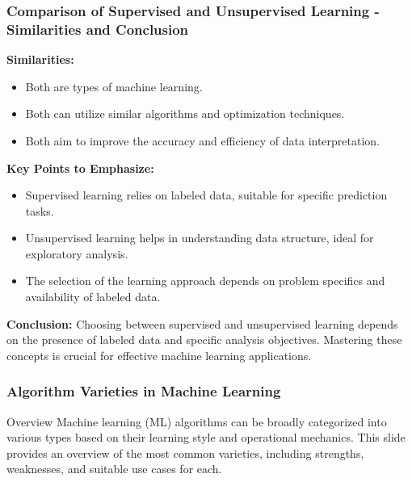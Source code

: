 \documentclass[aspectratio=169]{beamer}
\begin{document}
\begin{frame}[fragile]
    \frametitle{Comparison of Supervised and Unsupervised Learning - Similarities and Conclusion}
    
    \textbf{Similarities:}
    \begin{itemize}
        \item Both are types of machine learning.
        \item Both can utilize similar algorithms and optimization techniques.
        \item Both aim to improve the accuracy and efficiency of data interpretation.
    \end{itemize}
    
    \textbf{Key Points to Emphasize:}
    \begin{itemize}
        \item Supervised learning relies on labeled data, suitable for specific prediction tasks.
        \item Unsupervised learning helps in understanding data structure, ideal for exploratory analysis.
        \item The selection of the learning approach depends on problem specifics and availability of labeled data.
    \end{itemize}
    
    \textbf{Conclusion:} Choosing between supervised and unsupervised learning depends on the presence of labeled data and specific analysis objectives. Mastering these concepts is crucial for effective machine learning applications.
\end{frame}

\begin{frame}[fragile]
    \frametitle{Algorithm Varieties in Machine Learning}
    \begin{block}{Overview}
        Machine learning (ML) algorithms can be broadly categorized into various types based on their learning style and operational mechanics. This slide provides an overview of the most common varieties, including strengths, weaknesses, and suitable use cases for each.
    \end{block}
\end{frame}
\end{document}
